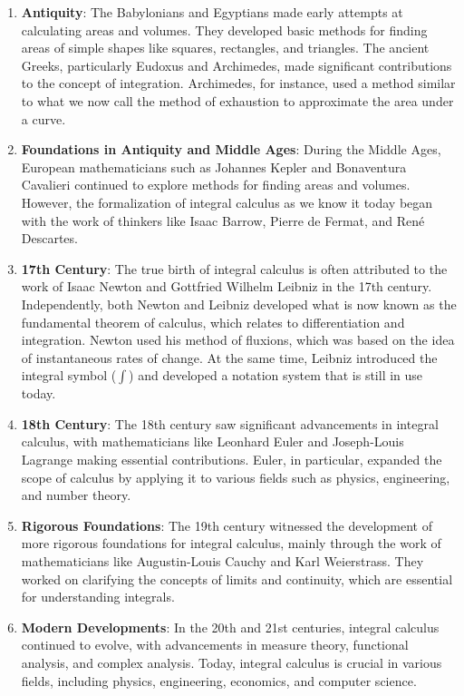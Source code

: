 \begin{enumerate}
    \item \textbf{Antiquity}: The Babylonians and Egyptians made early attempts at calculating areas and volumes. They developed basic methods for finding areas of simple shapes like squares, rectangles, and triangles. The ancient Greeks, particularly Eudoxus and Archimedes, made significant contributions to the concept of integration. Archimedes, for instance, used a method similar to what we now call the method of exhaustion to approximate the area under a curve.
    
    \item \textbf{Foundations in Antiquity and Middle Ages}: During the Middle Ages, European mathematicians such as Johannes Kepler and Bonaventura Cavalieri continued to explore methods for finding areas and volumes. However, the formalization of integral calculus as we know it today began with the work of thinkers like Isaac Barrow, Pierre de Fermat, and René Descartes.
    
    \item \textbf{17th Century}: The true birth of integral calculus is often attributed to the work of Isaac Newton and Gottfried Wilhelm Leibniz in the 17th century. Independently, both Newton and Leibniz developed what is now known as the fundamental theorem of calculus, which relates to differentiation and integration. Newton used his method of fluxions, which was based on the idea of instantaneous rates of change. At the same time, Leibniz introduced the integral symbol ($\int$) and developed a notation system that is still in use today.
    
    \item \textbf{18th Century}: The 18th century saw significant advancements in integral calculus, with mathematicians like Leonhard Euler and Joseph-Louis Lagrange making essential contributions. Euler, in particular, expanded the scope of calculus by applying it to various fields such as physics, engineering, and number theory.
    
    \item \textbf{Rigorous Foundations}: The 19th century witnessed the development of more rigorous foundations for integral calculus, mainly through the work of mathematicians like Augustin-Louis Cauchy and Karl Weierstrass. They worked on clarifying the concepts of limits and continuity, which are essential for understanding integrals.
    
    \item \textbf{Modern Developments}: In the 20th and 21st centuries, integral calculus continued to evolve, with advancements in measure theory, functional analysis, and complex analysis. Today, integral calculus is crucial in various fields, including physics, engineering, economics, and computer science.
\end{enumerate}

